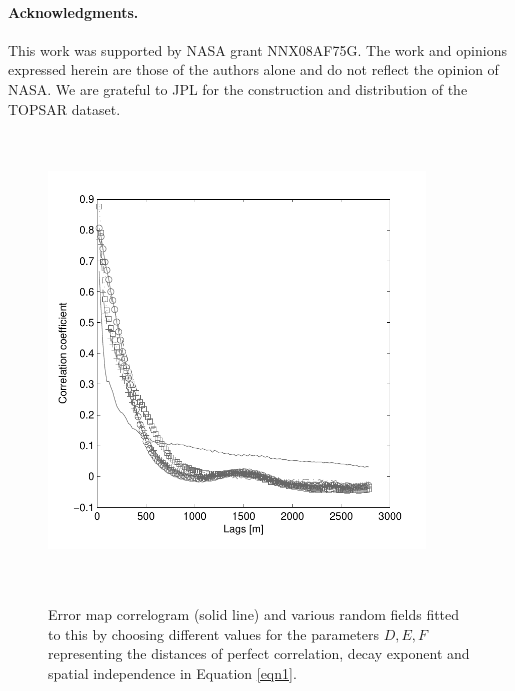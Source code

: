 \documentclass[12pt]{article}
\newcommand{\Pic}[2][0.85]{\begin{center}\texttt{[image: \#2]}
 \end{center} }
\begin{document}
\paragraph{Acknowledgments.}  This work was supported by NASA grant
NNX08AF75G.  The work and opinions expressed herein are those of the
authors alone and do not reflect the opinion of NASA.  We are grateful
to JPL for the construction and distribution of the TOPSAR dataset.

	
		

\begin{figure}[H]
\centering
	\includegraphics[width=10cm,height=12cm,keepaspectratio]{mammoth_error_correl.pdf}\\       
        \caption{ Error map correlogram (solid line) and various random
          fields fitted to this by choosing different values for the
          parameters $D,E,F$ representing the distances of perfect
          correlation, decay exponent and spatial independence in
          Equation \ref{eqn1}.}
\label{fig1}  
\end{figure}
\end{document}
